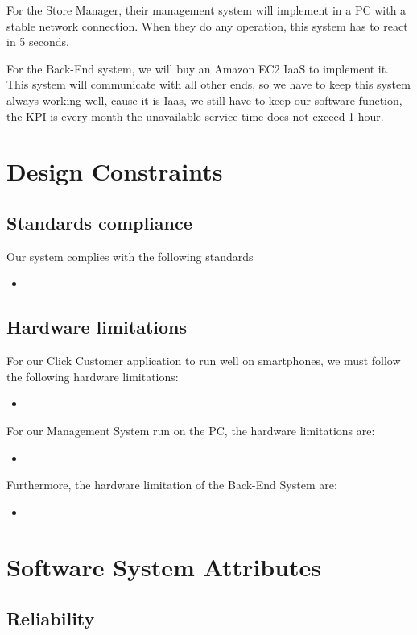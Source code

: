 \documentclass[a4paper,12pt]{report}
\begin{document}
For the Store Manager, their management system will implement in a PC with a stable network connection. When they do any operation, this system has to react in 5 seconds.

For the Back-End system, we will buy an Amazon EC2 IaaS to implement it. This system will communicate with all other ends, so we have to keep this system always working well, cause it is Iaas, we still have to keep our software function, the KPI is every month the unavailable service time does not exceed 1 hour.


\section{Design Constraints}
\subsection{Standards compliance}

Our system complies with the following standards
\begin{itemize}
	\item 
\end{itemize}


\subsection{Hardware limitations}

For our Click Customer application to run well on smartphones, we must follow the following hardware limitations:
\begin{itemize}
	\item 
\end{itemize}

For our Management System run on the PC, the hardware limitations are:
\begin{itemize}
	\item 
\end{itemize}

Furthermore, the hardware limitation of the Back-End System are:
\begin{itemize}
	\item 
\end{itemize}

\section{Software System Attributes}
\subsection{Reliability}
\end{document}

